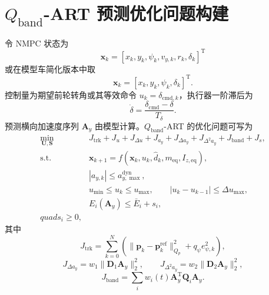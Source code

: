 \documentclass[UTF8,zihao=-4]{ctexrep}
\newcommand{\Qband}{$Q_{\mathrm{band}}$}
\newcommand{\ay}{a_y}
\newcommand{\T}{\mathrm{T}}
\begin{document}
\section{\Qband-ART 预测优化问题构建}
令 NMPC 状态为
\begin{equation}
    \bm x_k=[x_k,y_k,\psi_k,v_{y,k},r_k,\delta_k]^{\T}
\end{equation}
或在模型车简化版本中取
\begin{equation}
    \bm x_k=[x_k,y_k,\psi_k,\delta_k]^{\T}.
\end{equation}
控制量为期望前轮转角或其等效命令 $u_k=\delta_{\mathrm{cmd},k}$，执行器一阶滞后为
\begin{equation}
    \dot\delta=\frac{\delta_{\mathrm{cmd}}-\delta}{T_\delta}.
\end{equation}
预测横向加速度序列 $\bm A_y$ 由模型计算。\Qband-ART 的优化问题可写为
\begin{equation}
\begin{aligned}
\min_{\bm U,\bm S}~~& J_{\mathrm{trk}}+J_u+J_{\Delta u}+J_{\ay}+J_{\Delta \ay}+J_{\Delta^2\ay}+J_{\mathrm{band}}+J_s,\\
\mathrm{s.t.}~~& \bm x_{k+1}=f(\bm x_k,u_k,\hat d_k,m_{\mathrm{eq}},I_{z,\mathrm{eq}}),\\
& |a_{y,k}|\leq a_{y,\max}^{\mathrm{dyn}},\\
& u_{\min}\leq u_k\leq u_{\max},\qquad |u_k-u_{k-1}|\leq \Delta u_{\max},\\
& E_i(\bm A_y)\leq \bar E_i+s_i,\\quad s_i\geq 0,
\end{aligned}
\label{eq:nmpc_problem}
\end{equation}
其中
\begin{equation}
    J_{\mathrm{trk}}=\sum_{k=0}^{N}\left(\|\bm p_k-\bm p_{k}^{\mathrm{ref}}\|_{Q_p}^2+q_\psi e_{\psi,k}^2\right),
\end{equation}
\begin{equation}
    J_{\Delta \ay}=w_1\|\bm D_1\bm A_y\|_2^2,
    \qquad
    J_{\Delta^2\ay}=w_2\|\bm D_2\bm A_y\|_2^2,
\end{equation}
\begin{equation}
    J_{\mathrm{band}}=\sum_iw_i(t)\bm A_y^{\T}\bm Q_i\bm A_y.
\end{equation}
\end{document}
